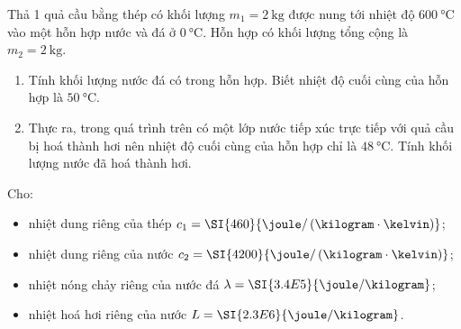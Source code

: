 \begin{ex}
Thả 1 quả cầu bằng thép có khối lượng $m_1=\SI{2}{\kilogram}$ được nung tới nhiệt độ $\SI{600}{\celsius}$ vào một hỗn hợp nước và đá ở $\SI{0}{\celsius}$. Hỗn hợp có khối lượng tổng cộng là $m_2=\SI{2}{\kilogram}$.
\begin{enumerate}[label=\alph*)]
	\item Tính khối lượng nước đá có trong hỗn hợp. Biết nhiệt độ cuối cùng của hỗn hợp là $\SI{50}{\celsius}$.
	\item Thực ra, trong quá trình trên có một lớp nước tiếp xúc trực tiếp với quả cầu bị hoá thành hơi nên nhiệt độ cuối cùng của hỗn hợp chỉ là $\SI{48}{\celsius}$. Tính khối lượng nước đã hoá thành hơi.
\end{enumerate}
Cho:
\begin{itemize}
	\item nhiệt dung riêng của thép $c_1=\SI{460}{\joule/\left(\kilogram\cdot\kelvin\right)}$;
	\item nhiệt dung riêng của nước $c_2=\SI{4200}{\joule/\left(\kilogram\cdot\kelvin\right)}$;
	\item nhiệt nóng chảy riêng của nước đá $\lambda=\SI{3.4E5}{\joule/\kilogram}$;
	\item nhiệt hoá hơi riêng của nước $L=\SI{2.3E6}{\joule/\kilogram}$.
\end{itemize}
\end{ex}